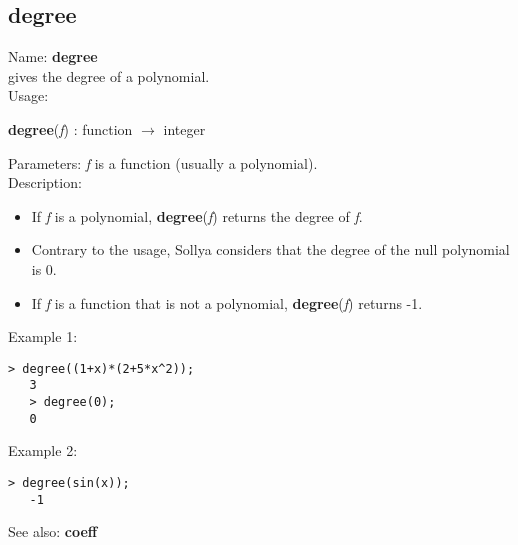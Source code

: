 \subsection{ degree }
\noindent Name: \textbf{degree}\\
gives the degree of a polynomial.\\

\noindent Usage: 
\begin{center}
\textbf{degree}(\emph{f}) : \textsf{function} $\rightarrow$ \textsf{integer}\\
\end{center}
Parameters: 
\emph{f} is a function (usually a polynomial).\\

\noindent Description: \begin{itemize}

\item If \emph{f} is a polynomial, \textbf{degree}(\emph{f}) returns the degree of \emph{f}.

\item Contrary to the usage, Sollya considers that the degree of the null polynomial
   is 0.

\item If \emph{f} is a function that is not a polynomial, \textbf{degree}(\emph{f}) returns -1.
\end{itemize}
\noindent Example 1: 
\begin{center}\begin{minipage}{14.8cm}\begin{Verbatim}[frame=single]
   > degree((1+x)*(2+5*x^2));
   3
   > degree(0);
   0
\end{Verbatim}
\end{minipage}\end{center}
\noindent Example 2: 
\begin{center}\begin{minipage}{14.8cm}\begin{Verbatim}[frame=single]
   > degree(sin(x));
   -1
\end{Verbatim}
\end{minipage}\end{center}
See also: \textbf{coeff}
